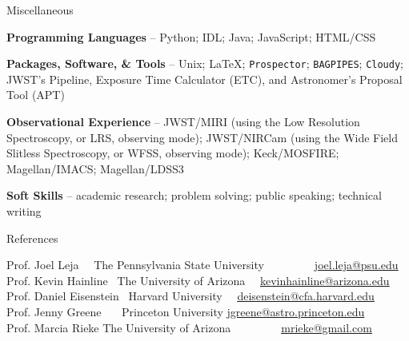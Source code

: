 \documentclass{JMH_CV}
\begin{document}

\begin{rSection}{Miscellaneous}

\textbf{Programming Languages} -- Python; IDL; Java; JavaScript; HTML/CSS

\textbf{Packages, Software, \& Tools} -- Unix; \LaTeX; \texttt{Prospector}; \texttt{BAGPIPES}; \texttt{Cloudy}; JWST's Pipeline, Exposure Time Calculator (ETC), and Astronomer's Proposal Tool (APT)

\textbf{Observational Experience} -- JWST/MIRI (using the Low Resolution Spectroscopy, or LRS, observing mode); JWST/NIRCam (using the Wide Field Slitless Spectroscopy, or WFSS, observing mode); Keck/MOSFIRE; Magellan/IMACS; Magellan/LDSS3

\textbf{Soft Skills} -- academic research; problem solving; public speaking; technical writing

\end{rSection}


\begin{rSection}{References}

Prof. Joel Leja \ \ \hfill The Pennsylvania State University \ \ \hfill \ \ \ \ \ \,\,  \href{mailto:joel.leja@psu.edu}{\ul{joel.leja@psu.edu}} \\
Prof. Kevin Hainline \ \hfill The University of Arizona \ \ \hfill \href{mailto:kevinhainline@arizona.edu}{\ul{kevinhainline@arizona.edu}} \\
Prof. Daniel Eisenstein \ \hfill Harvard University \ \ \hfill \href{mailto:deisenstein@cfa.harvard.edu}{\ul{deisenstein@cfa.harvard.edu}} \\
Prof. Jenny Greene \ \ \ \hfill Princeton University \hfill \href{mailto:jgreene@astro.princeton.edu}{\ul{jgreene@astro.princeton.edu}} \\
Prof. Marcia Rieke \hfill The University of Arizona \hfill \ \ \ \ \ \ \ \,\, \href{mailto:mrieke@gmail.com}{\ul{mrieke@gmail.com}} \\


\end{rSection}
\end{document}
